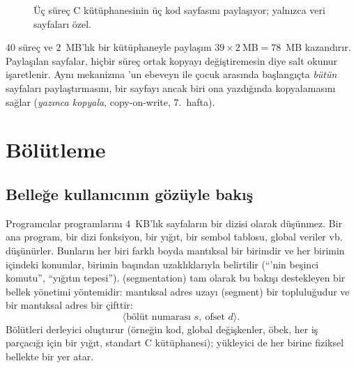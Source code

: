 \begin{figure}[H]
\centering
{}
\caption{Üç süreç C kütüphanesinin üç kod sayfasını paylaşıyor; yalnızca veri sayfaları özel.}
\end{figure}

$40$ süreç ve $2$~MB'lık bir kütüphaneyle paylaşım $39 \times 2\ \text{MB} = 78$~MB kazandırır. Paylaşılan sayfalar, hiçbir süreç ortak kopyayı değiştiremesin diye salt okunur işaretlenir. Aynı mekanizma 'un ebeveyn ile çocuk arasında başlangıçta \emph{bütün} sayfaları paylaştırmasını, bir sayfayı ancak biri ona yazdığında kopyalamasını sağlar (\emph{yazınca kopyala}, copy-on-write, 7.~hafta).

\section{Bölütleme}

\subsection{Belleğe kullanıcının gözüyle bakış}

Programcılar programlarını $4$~KB'lık sayfaların bir dizisi olarak düşünmez. Bir ana program, bir dizi fonksiyon, bir yığıt, bir sembol tablosu, global veriler vb. düşünürler. Bunların her biri farklı boyda mantıksal bir birimdir ve her birimin içindeki konumlar, birimin başından uzaklıklarıyla belirtilir (``'nin beşinci komutu'', ``yığıtın tepesi'').  (segmentation) tam olarak bu bakışı destekleyen bir bellek yönetimi yöntemidir: mantıksal adres uzayı  (segment) bir topluluğudur ve bir mantıksal adres bir çifttir:
\[
\langle \text{bölüt numarası } s,\ \text{ofset } d \rangle .
\]
Bölütleri derleyici oluşturur (örneğin kod, global değişkenler, öbek, her iş parçacığı için bir yığıt, standart C kütüphanesi); yükleyici de her birine fiziksel bellekte bir yer atar.

